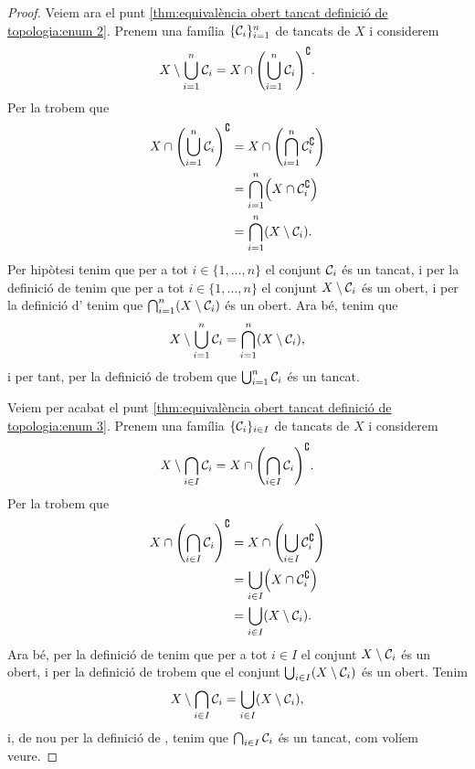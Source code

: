 \documentclass[../Apunts.tex]{subfiles}
\begin{document}
\begin{theorem}
\begin{proof}
			Veiem ara el punt \eqref{thm:equivalència obert tancat definició de topologia:enum 2}. Prenem una família \(\{\mathcal{C}_{i}\}_{i=1}^{n}\) de tancats de \(X\) i considerem
			\[X\setminus\bigcup_{i=1}^{n}\tancat{C}_{i}=X\cap\left(\bigcup_{i=1}^{n}\tancat{C}_{i}\right)^{\complement}.\]
			Per la  trobem que
			\begin{align*}
				X\cap\left(\bigcup_{i=1}^{n}\tancat{C}_{i}\right)^{\complement}&=X\cap\left(\bigcap_{i=1}^{n}\tancat{C}_{i}^{\complement}\right) \\
				&=\bigcap_{i=1}^{n}\left(X\cap\tancat{C}_{i}^{\complement}\right) \\
				&=\bigcap_{i=1}^{n}\left(X\setminus\tancat{C}_{i}\right).
			\end{align*}
			Per hipòtesi tenim que per a tot \(i\in\{1,\dots,n\}\) el conjunt \(\mathcal{C}_{i}\) és un tancat, i per la definició de  tenim que per a tot \(i\in\{1,\dots,n\}\) el conjunt \(X\setminus\mathcal{C}_{i}\) és un obert, i per la definició d' tenim que \(\bigcap_{i=1}^{n}\left(X\setminus\tancat{C}_{i}\right)\) és un obert. Ara bé, tenim que
			\[X\setminus\bigcup_{i=1}^{n}\tancat{C}_{i}=\bigcap_{i=1}^{n}\left(X\setminus\tancat{C}_{i}\right),\]
			i per tant, per la definició de  trobem que \(\bigcup_{i=1}^{n}\mathcal{C}_{i}\) és un tancat.
			
			Veiem per acabat el punt \eqref{thm:equivalència obert tancat definició de topologia:enum 3}. Prenem una família \(\{\mathcal{C}_{i}\}_{i\in I}\) de tancats de \(X\) i considerem
			\[X\setminus\bigcap_{i\in I}\tancat{C}_{i}=X\cap\left(\bigcap_{i\in I}\tancat{C}_{i}\right)^{\complement}.\]
			Per la  trobem que
			\begin{align*}
				X\cap\left(\bigcap_{i\in I}\tancat{C}_{i}\right)^{\complement}&=X\cap\left(\bigcup_{i\in I}\tancat{C}_{i}^{\complement}\right) \\
				&=\bigcup_{i\in I}\left(X\cap\tancat{C}_{i}^{\complement}\right) \\
				&=\bigcup_{i\in I}\left(X\setminus\tancat{C}_{i}\right).
			\end{align*}
			Ara bé, per la definició de  tenim que per a tot \(i\in I\) el conjunt \(X\setminus\mathcal{C}_{i}\) és un obert, i per la definició de  trobem que el conjunt \(\bigcup_{i\in I}\left(X\setminus\tancat{C}_{i}\right)\) és un obert. Tenim
			\[X\setminus\bigcap_{i\in I}\tancat{C}_{i}=\bigcup_{i\in I}\left(X\setminus\tancat{C}_{i}\right),\]
			i, de nou per la definició de , tenim que \(\bigcap_{i\in I}\mathcal{C}_{i}\) és un tancat, com volíem veure.
		\end{proof}
	\end{theorem}
\end{document}
